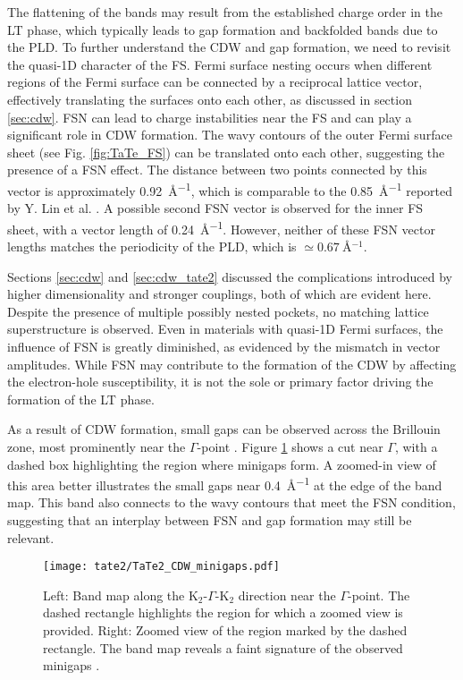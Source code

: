 The flattening of the bands may result from the established charge order in the LT phase, which typically leads to gap formation and backfolded bands due to the PLD.
To further understand the CDW and gap formation, we need to revisit the quasi-1D character of the FS.
Fermi surface nesting occurs when different regions of the Fermi surface can be connected by a reciprocal lattice vector, effectively translating the surfaces onto each other, as discussed in section \ref{sec:cdw}.
FSN can lead to charge instabilities near the FS and can play a significant role in CDW formation.
The wavy contours of the outer Fermi surface sheet (see Fig. \ref{fig:TaTe_FS}) can be translated onto each other, suggesting the presence of a FSN effect.
The distance between two points connected by this vector is approximately \qty{0.92}{\angstrom^{-1}}, which is comparable to the \qty{0.85}{\angstrom^{-1}} reported by Y. Lin et al. \cite{lin_evidence_2022}.
A possible second FSN vector is observed for the inner FS sheet, with a vector length of \qty{0.24}{\angstrom^{-1}}.
However, neither of these FSN vector lengths matches the periodicity of the PLD, which is $\simeq\qty{0.67}{\angstrom^{-1}}$.

Sections \ref{sec:cdw} and \ref{sec:cdw_tate2} discussed the complications introduced by higher dimensionality and stronger couplings, both of which are evident here.
Despite the presence of multiple possibly nested pockets, no matching lattice superstructure is observed.
Even in materials with quasi-1D Fermi surfaces, the influence of FSN is greatly diminished, as evidenced by the mismatch in vector amplitudes.
While FSN may contribute to the formation of the CDW by affecting the electron-hole susceptibility, it is not the sole or primary factor driving the formation of the LT phase.

As a result of CDW formation, small gaps can be observed across the Brillouin zone, most prominently near the $\Gamma$-point \cite{lin_evidence_2022}.
Figure \ref{fig:TaTe_minigaps} shows a cut near $\Gamma$, with a dashed box highlighting the region where minigaps form.
A zoomed-in view of this area better illustrates the small gaps near \qty{0.4}{\angstrom^{-1}} at the edge of the band map.
This band also connects to the wavy contours that meet the FSN condition, suggesting that an interplay between FSN and gap formation may still be relevant.

\begin{figure}[t]
	\centering
	\texttt{[image: tate2/TaTe2\_CDW\_minigaps.pdf]}
	\caption{Left: Band map along the K$_2$-$\Gamma$-K$_2$ direction near the $\Gamma$-point. The dashed rectangle highlights the region for which a zoomed view is provided. Right: Zoomed view of the region marked by the dashed rectangle. The band map reveals a faint signature of the observed minigaps \cite{lin_evidence_2022}.}
	\label{fig:TaTe_minigaps}
\end{figure}

